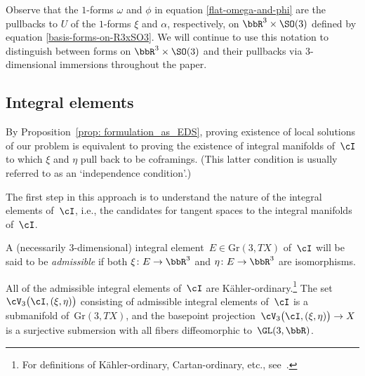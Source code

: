 \begin{Remark}Observe that the $1$-forms $\omega$ and $\phi$ in equation \eqref{flat-omega-and-phi} are the pullbacks to $U$ of the $1$-forms $\xi$ and $\alpha$, respectively, on $\bbR^3 \times \SO(3)$ defined by equation \eqref{basis-forms-on-R3xSO3}. We will continue to use this notation to distinguish between forms on $\bbR^3 \times \SO(3)$ and their pullbacks via 3-dimensional immersions throughout the paper.
\end{Remark}



\subsection{Integral elements}
By Proposition~\ref{prop: formulation_as_EDS},
proving existence of local solutions of our problem
is equivalent to proving the existence of integral manifolds of~$\cI$
to which $\xi$ and $\eta$ pull back to be coframings. (This latter
condition is usually referred to as an `independence condition'.)

The first step in this approach
is to understand the nature of the integral elements of~$\cI$,
i.e., the candidates for tangent spaces to the integral manifolds of~$\cI$.

A (necessarily $3$-dimensional) integral element~$E\in\mathrm{Gr}(3,TX)$
of~$\cI$ will be said to be \emph{admissible}
if both $\xi\colon E\to\bbR^3$ and $\eta\colon E\to\bbR^3$ are isomorphisms.

\begin{Proposition}\label{prop: K-ordinaryintegralelements}
All of the admissible integral elements of~$\cI$ are K\"ahler-ordinary.\footnote{For definitions of K\"ahler-ordinary, Cartan-ordinary, etc.,
see~\cite[Chapter~III, Definition~1.7]{BCGGG}.}
The set $\cV_3\bigl(\cI,(\xi,\eta)\bigr)$
consisting of admissible integral elements of~$\cI$
is a submanifold of~$\mathrm{Gr}(3,TX)$,
and the basepoint projection~$\cV_3\bigl(\cI,(\xi,\eta)\bigr)\to X$
is a surjective submersion
with all fibers diffeomorphic to~$\GL(3,\bbR)$.
\end{Proposition}

